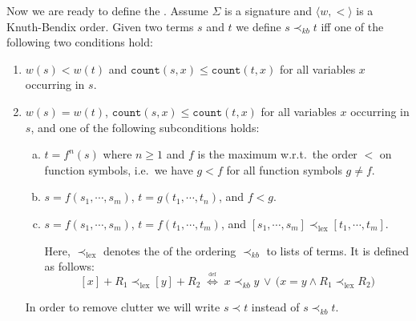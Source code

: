 \begin{Definition}[$\prec_{kb}$]
  Now we are ready to define the .
  Assume $\Sigma$ is a signature and $\langle w, < \rangle$ is a Knuth-Bendix order.
  Given two terms $s$ and $t$ we define $s \prec_{kb} t$ iff one of the following two conditions hold:
\begin{enumerate}
\item $w(s) < w(t)$ and $\texttt{count}(s, x) \leq \texttt{count}(t, x)$
       for all variables $x$ occurring in  $s$.
\item $w(s) = w(t)$, $\texttt{count}(s, x) \leq \texttt{count}(t, x)$ for all variables $x$ occurring in $s$, and
      one of the following subconditions holds:
      \begin{enumerate}[(a)]
      \item $t = f^n(s)$ where $n \geq 1$ and $f$ is the maximum w.r.t.~the order $<$ on function symbols,
             i.e.~we have $g < f$ for all function symbols $g \not= f$.
      \item $s = f(s_1,\cdots,s_m)$, $t=g(t_1,\cdots,t_n)$, and $f<g$.
      \item $s = f(s_1,\cdots,s_m)$, $t=f(t_1,\cdots,t_m)$, and $[s_1,\cdots,s_m] \prec_{\textrm{lex}} [t_1,\cdots,t_m]$.
     
            Here, $\prec_{\textrm{lex}}$ denotes the  of the ordering $\prec_{kb}$ to
            lists of terms.  It is defined as follows:
            $$ [x] + R_1 \prec_{\textrm{lex}} [y] + R_2 \;\stackrel{_\textrm{def}}{\Longleftrightarrow}\;
                 x \prec_{kb} y \,\vee\, \bigl(x = y \wedge R_1 \prec_{\textrm{lex}} R_2\bigr)
            $$
     \end{enumerate}
     In order to remove clutter we will write $s \prec t$ instead of $s \prec_{kb} t$. \eox
\end{enumerate}
\end{Definition}




